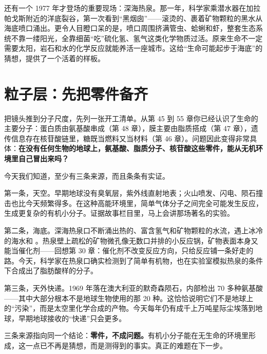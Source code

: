 还有一个 1977 年才登场的重要现场：深海热泉。那一年，科学家乘潜水器在加拉帕戈斯附近的洋底裂谷，第一次看到“黑烟囱”——滚烫的、裹着矿物颗粒的黑水从海底喷口涌出。更令人目瞪口呆的是，喷口周围挤满管虫、蛤蜊和虾，整套生态系统不靠一缕阳光，全靠细菌“吃”硫化氢、氢气这类化学物质过活。原来生命不一定需要太阳，岩石和水的化学反应就能养活一座城市。这给“生命可能起步于海底”的猜想，提供了一个活着的样板。

\section{粒子层：先把零件备齐}

把镜头推到分子尺度，先列一张开工清单。从第 45 到 55 章你已经认识了生命的主要分子：蛋白质由氨基酸串成（第 48 章），膜主要由脂质搭成（第 47 章），遗传信息存在核苷酸链里，糖既当燃料又当材料（第 46 章）。问题因此变得非常具体：\textbf{在没有任何生物的地球上，氨基酸、脂质分子、核苷酸这些零件，能从无机环境里自己冒出来吗？}

今天我们知道，至少有三条来源，而且条条有实证。

第一条，天空。早期地球没有臭氧层，紫外线直射地表；火山喷发、闪电、陨石撞击也比今天频繁得多。在这种高能环境里，简单气体分子之间完全可能发生反应，生成更复杂的有机小分子。证据故事栏目里，马上会讲那场著名的实验。

第二条，海底。深海热泉口不断涌出热的、富含氢气和矿物颗粒的水流，遇上冰冷的海水和 。热泉壁上疏松的矿物微孔像无数口并排的小反应锅，矿物表面本身又能当催化剂——回想第 30 章：催化剂不改变反应方向，只给反应铺一条好走的路。今天，科学家在热泉口确实检测到了简单有机物，也在实验室模拟热泉的条件下合成出了脂肪酸样的分子。

第三条，天外快递。1969 年落在澳大利亚的默奇森陨石，内部检出 70 多种氨基酸——其中大部分根本不是地球生物使用的那 20 种。这恰恰说明它们不是地球上的“污染”，而是太空里化学合成的产物。今天每年仍有成千上万吨星际尘埃落到地球，早期地球接收的“快递”只会更多。

三条来源指向同一个结论：\textbf{零件，不成问题。}有机小分子能在无生命的环境里形成，这一点已不再是猜想，而是测得到的事实。真正的难题在下一步。

